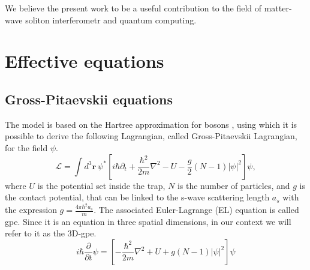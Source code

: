 \documentclass[pra,twocolumn]{revtex4-2}
\begin{document}
  We believe the present work to be a useful contribution to the field of matter-wave soliton interferometr and quantum computing.

  \begin{comment}
  \cite{streltsovscattering2009} MCTDHB
  \cite{deviation} cubic-quintic NLSE

  quantum-enhance interferometry

  Lewenstein Malomed - Although under extreme conditions the quantum fluctuations may split a mean-field soliton [29], it has
  been concluded that, in a broad range of parameters relevant to the experiments, the matter–wave
  solitary waves predicted by the mean-field description (i.e. found as stable localized solutions
  to the Gross–Pitaevskii equation (GPE) [8]) are completely robust objects—in fact, in perfect
  agreement with the experimental observations of these solitons [17]–[20]

  Many studies focus on the 1D case, Lieb Liniger model full quantum ecc... Mean-field studies in the 3D to 1D crossover are not so well developed. 

  gerj generating -> lewenstein malomed

  fundamental component of an interferometer

  helm -> analysis of quantum fluctuations and degradation on interferometry

  high energy to low energy regime in soliton units...
  \end{comment}%


\section{Effective equations}\label{sec:analytical}
\subsection{Gross-Pitaevskii equations}
  The model is based on the Hartree approximation for bosons \cite{liebexact}, using which it is possible to derive the following Lagrangian, called Gross-Pitaevskii Lagrangian, for the field $\psi$.
  \begin{equation}\label{eq:3dlagrangian}
      \mathcal{L}= \int d^3 \mathbf{r} \ \psi^* \left[i \hbar \partial_t+\frac{\hbar^2}{2 m} \nabla^2-U-\frac{g}{2}(N-1)|\psi|^2 \right] \psi,
  \end{equation}
  where $U$ is the potential set inside the trap, $N$ is the number of particles, and $g$ is the contact potential, that can be linked to the s-wave scattering length $a_s$ with the expression $g = \frac{4\pi \hbar^2 a_s}{m}$.
  The associated Euler-Lagrange (EL) equation is called \gls{gpe}. Since it is an equation in three spatial dimensions, in our context we will refer to it as the 3D-\gls{gpe}.
  \begin{equation}\label{eq:3dgpe}
      i\hbar \dfrac{\partial}{\partial t}\psi = \left[-\dfrac{\hbar^2}{2m} \nabla^2 + U  + g(N-1)|\psi|^2\right]\psi
  \end{equation}
\end{document}

